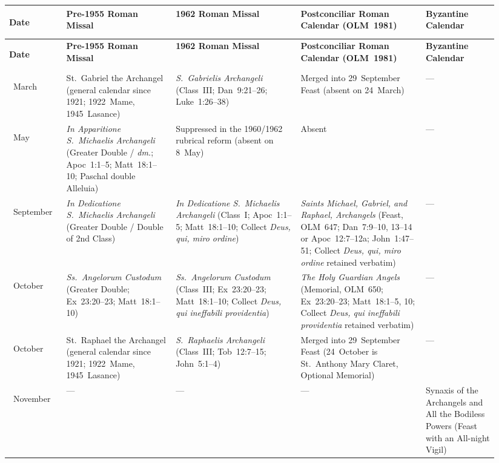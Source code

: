 {\footnotesize
\setlength{\tabcolsep}{2.5pt}
\renewcommand{\arraystretch}{1.15}
\begin{longtable}{>{\bfseries\raggedright\arraybackslash}p{0.11\linewidth}>{\raggedright\arraybackslash}p{0.21\linewidth}>{\raggedright\arraybackslash}p{0.24\linewidth}>{\raggedright\arraybackslash}p{0.24\linewidth}>{\raggedright\arraybackslash}p{0.14\linewidth}}
\toprule
\textbf{Date} & \textbf{Pre-1955 Roman Missal} & \textbf{1962 Roman Missal} & \textbf{Postconciliar Roman Calendar (OLM~1981)} & \textbf{Byzantine Calendar} \\
\midrule
\endfirsthead
\toprule
\textbf{Date} & \textbf{Pre-1955 Roman Missal} & \textbf{1962 Roman Missal} & \textbf{Postconciliar Roman Calendar (OLM~1981)} & \textbf{Byzantine Calendar} \\
\midrule
\endhead
\bottomrule
\endfoot
24~March & St.~Gabriel the Archangel (general calendar since 1921; 1922~Mame, 1945~Lasance) & \emph{S.~Gabrielis Archangeli} (Class~III; Dan~9:21--26; Luke~1:26--38) & Merged into 29~September Feast (absent on 24~March) & --- \\
\addlinespace[2pt]
8~May & \emph{In Apparitione S.~Michaelis Archangeli} (Greater Double / \emph{dm.}; Apoc~1:1--5; Matt~18:1--10; Paschal double Alleluia) & Suppressed in the 1960/1962 rubrical reform (absent on 8~May) & Absent & --- \\
\addlinespace[2pt]
29~September & \emph{In Dedicatione S.~Michaelis Archangeli} (Greater Double / Double of 2nd Class) & \emph{In Dedicatione S.~Michaelis Archangeli} (Class~I; Apoc~1:1--5; Matt~18:1--10; Collect \emph{Deus, qui, miro ordine}) & \emph{Saints Michael, Gabriel, and Raphael, Archangels} (Feast, OLM~647; Dan~7:9--10, 13--14 or Apoc~12:7--12a; John~1:47--51; Collect \emph{Deus, qui, miro ordine} retained verbatim) & --- \\
\addlinespace[2pt]
2~October & \emph{Ss.~Angelorum Custodum} (Greater Double; Ex~23:20--23; Matt~18:1--10) & \emph{Ss.~Angelorum Custodum} (Class~III; Ex~23:20--23; Matt~18:1--10; Collect \emph{Deus, qui ineffabili providentia}) & \emph{The Holy Guardian Angels} (Memorial, OLM~650; Ex~23:20--23; Matt~18:1--5, 10; Collect \emph{Deus, qui ineffabili providentia} retained verbatim) & --- \\
\addlinespace[2pt]
24~October & St.~Raphael the Archangel (general calendar since 1921; 1922~Mame, 1945~Lasance) & \emph{S.~Raphaelis Archangeli} (Class~III; Tob~12:7--15; John~5:1--4) & Merged into 29~September Feast (24~October is St.~Anthony Mary Claret, Optional Memorial) & --- \\
\addlinespace[2pt]
8~November & --- & --- & --- & Synaxis of the Archangels and All the Bodiless Powers (Feast with an All-night Vigil) \\
\end{longtable}
}

